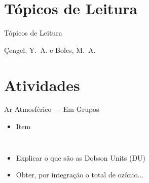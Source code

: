 \section{Tópicos de Leitura}

    \begin{frame}{Tópicos de Leitura}
        \begin{thebibliography}{Çengel, Y.~A., 2013}
                Çengel, Y.~A. e Boles, M.~A.
        \end{thebibliography}
    \end{frame}

\section{Atividades}

    \begin{frame}[allowframebreaks]{Ar Atmosférico --- Em Grupos}\vspace*{-0em}
        
        \begin{itemize}
            \item<1-> Item
        \end{itemize}

        \pagebreak

        \begin{columns}
            \begin{itemize}
                \item<1-> Explicar o que são as Dobson Units (DU)
                \item<1-> Obter, por integração o total de ozônio...
            \end{itemize}
        \end{columns}

    \end{frame}




